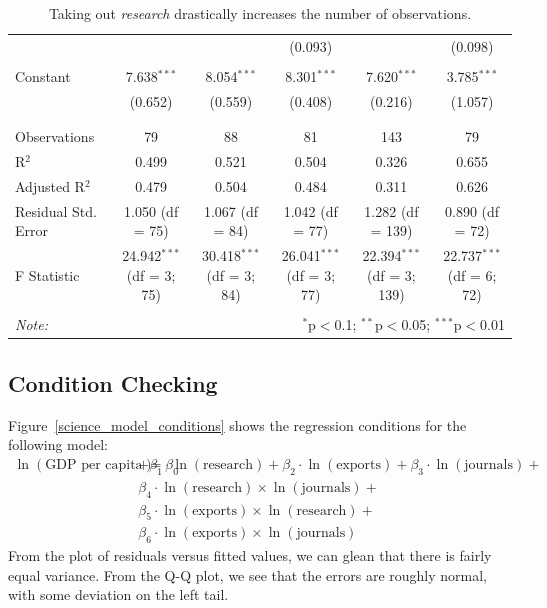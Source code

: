 \documentclass[11pt]{article}
\begin{document}
\begin{landscape}
\begin{table}[!htbp]
\begin{tabular}{@{\extracolsep{5pt}}lccccc}
  &  &  & (0.093) &  & (0.098) \\ 
  & & & & & \\ 
 Constant & 7.638$^{***}$ & 8.054$^{***}$ & 8.301$^{***}$ & 7.620$^{***}$ & 3.785$^{***}$ \\ 
  & (0.652) & (0.559) & (0.408) & (0.216) & (1.057) \\ 
  & & & & & \\ 
\hline \\[-1.8ex] 
Observations & 79 & 88 & 81 & 143 & 79 \\ 
R$^{2}$ & 0.499 & 0.521 & 0.504 & 0.326 & 0.655 \\ 
Adjusted R$^{2}$ & 0.479 & 0.504 & 0.484 & 0.311 & 0.626 \\ 
Residual Std. Error & 1.050 (df = 75) & 1.067 (df = 84) & 1.042 (df = 77) & 1.282 (df = 139) & 0.890 (df = 72) \\ 
F Statistic & 24.942$^{***}$ (df = 3; 75) & 30.418$^{***}$ (df = 3; 84) & 26.041$^{***}$ (df = 3; 77) & 22.394$^{***}$ (df = 3; 139) & 22.737$^{***}$ (df = 6; 72) \\ 
\hline 
\hline \\[-1.8ex] 
\textit{Note:}  & \multicolumn{5}{r}{$^{*}$p$<$0.1; $^{**}$p$<$0.05; $^{***}$p$<$0.01} \\ 
\end{tabular} 
\caption{\label{science_model_regressions}Taking out \emph{research} drastically increases the number of observations.}
\end{table} 
\end{landscape}
\restoregeometry
\doublespacing


\subsection{Condition Checking}

Figure~\ref{science_model_conditions} shows the regression conditions for the following model:
\begin{align*}
\ln(\textrm{GDP per capita}) = \beta_0 &+
\beta_1 \cdot \ln(\textrm{research}) +
\beta_2 \cdot \ln(\textrm{exports}) +
\beta_3 \cdot \ln(\textrm{journals}) + \\
&\beta_4 \cdot \ln(\textrm{research}) \times \ln(\textrm{journals}) + \\
&\beta_5 \cdot \ln(\textrm{exports}) \times \ln(\textrm{research}) + \\
&\beta_6 \cdot \ln(\textrm{exports}) \times \ln(\textrm{journals})
\end{align*}
From the plot of residuals versus fitted values, we can glean that there is fairly equal variance.
From the Q-Q plot, we see that the errors are roughly normal, with some deviation on the left tail.
\end{document}
